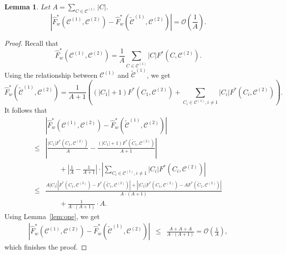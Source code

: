 \documentclass[review,los,12pt]{ryethesis}
\newtheorem{lemma}[theorem]{Lemma}
\newcommand\cCone{\mathcal{C}^{(1)}}
\newcommand\tcCone{\tilde{\mathcal{C}}^{(1)}}
\newcommand\cCtwo{\mathcal{C}^{(2)}}
\newcommand{\bigO}{\mathcal{O}}
\begin{document}
\begin{lemma}\label{lem:two}
    Let $A = \sum_{C \in \cCone} |C|$.
    \begin{equation*}
        \left| \hat{F}^*_w(\cCone, \cCtwo) - \hat{F}^*_w(\tcCone, \cCtwo) \right| = \bigO\left(\frac{1}{A}\right).
    \end{equation*}
\end{lemma}
\begin{proof}
    Recall that
    \begin{equation*}
        \hat{F}^*_w(\cCone, \cCtwo) = \frac{1}{A} \sum_{C \in \cCone} |C|F^*(C, \cCtwo).
    \end{equation*}
    Using the relationship between $\cCone$ and $\tcCone$, we get
    \begin{equation*}
        \hat{F}^*_w(\tcCone, \cCtwo) = \frac{1}{A+1}\left((|C_1|+1)F^*(C_1, \cCtwo) + \sum_{C_i \in \cCone, i \neq 1} |C_i|F^*(C_i,\cCtwo)\right).
    \end{equation*}
    It follows that
    \begin{align*}
    & \left| \hat{F}^*_w (\cCone, \cCtwo) - \hat{F}^*_w (\tcCone, \cCtwo) \right| \\
    \le& \left| \frac {|C_1| F^*(C_1, \cCtwo)} {A} - \frac {(|C_1|+1) F^*(\tilde{C}_1, \cCtwo)} {A+1} \right| \\
    & \qquad + \left| \frac {1}{A} - \frac {1}{A+1} \right| \cdot \left| \sum_{C_i \in \cCone, i \neq 1} |C_i| F^*(C_i, \cCtwo) \right| \\
    \le& \frac {A |C_1| \left| F^*(C_1, \cCtwo) - F^*(\tilde{C}_1, \cCtwo) \right| + \left| |C_1| F^*(C_1, \cCtwo) - A F^*(\tilde{C}_1, \cCtwo) \right| }{A \cdot (A+1)} \\
    & \qquad + \frac {1}{A \cdot (A+1)} \cdot A.
    \end{align*}
    Using Lemma~\ref{lem:one}, we get 
    \begin{eqnarray*}
    \left| \hat{F}^*_w (\cCone, \cCtwo) - \hat{F}^*_w (\tcCone, \cCtwo) \right| &\le& \frac {A+A+A}{A \cdot (A+1)} = \bigO\left(\frac{1}{A}\right),
    \end{eqnarray*}
    which finishes the proof.
\end{proof}
\end{document}
